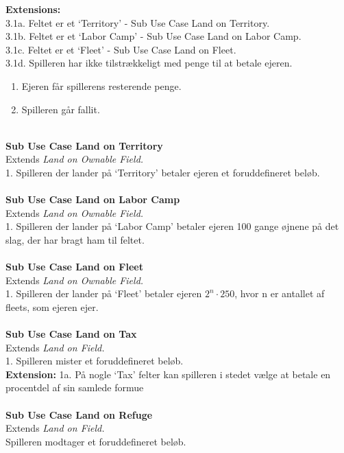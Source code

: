 \textbf{Extensions:}\\
3.1a. Feltet er et ‘Territory’ - Sub Use Case Land on Territory.\\
3.1b. Feltet er et ‘Labor Camp’ - Sub Use Case Land on Labor Camp.\\
3.1c. Feltet er et ‘Fleet’ - Sub Use Case Land on Fleet.\\
3.1d. Spilleren har ikke tilstrækkeligt med penge til at betale ejeren.
\begin{enumerate}
  \item Ejeren får spillerens resterende penge.
  \item Spilleren går fallit.
\end{enumerate}
\\
\textbf{\large Sub Use Case Land on Territory}\\
Extends \emph{Land on Ownable Field.}\\
1. Spilleren der lander på ‘Territory’ betaler ejeren et foruddefineret
beløb.\\
\\
\textbf{\large Sub Use Case Land on Labor Camp}\\
Extends \emph{Land on Ownable Field.}\\
1. Spilleren der lander på ‘Labor Camp’ betaler ejeren 100 gange øjnene på det
slag, der har bragt ham til feltet.\\
\\
\textbf{\large Sub Use Case Land on Fleet}\\
Extends \emph{Land on Ownable Field.}\\
1. Spilleren der lander på ‘Fleet’ betaler ejeren $2^n \cdot 250 $, hvor n er
antallet af fleets, som ejeren ejer.\\
\\
\textbf{\large Sub Use Case Land on Tax}\\
Extends \emph{Land on Field.}\\
1. Spilleren mister et foruddefineret beløb.\\
\textbf{Extension:}
1a. På nogle ‘Tax’ felter kan spilleren i stedet vælge at betale en procentdel
af sin samlede formue\\
\\
\textbf{\large Sub Use Case Land on Refuge}\\
Extends \emph{Land on Field.}\\
Spilleren modtager et foruddefineret beløb.\\
